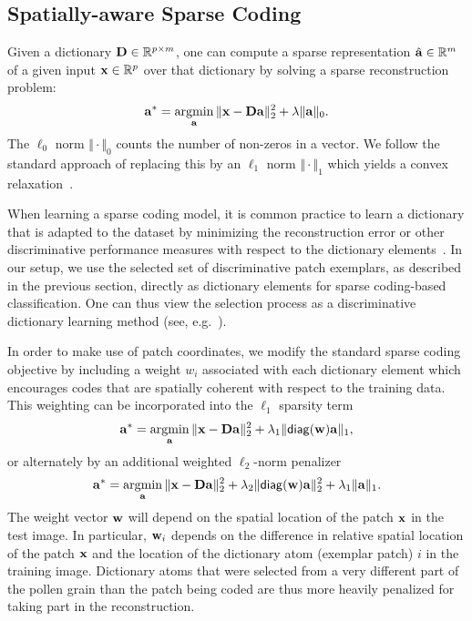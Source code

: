 \documentclass[10pt,twocolumn,letterpaper]{article}
\def\a{{\bf a}}
\def\D{{\bf D}}
\def\x{{\bf x}}
\def\w{{\bf w}}
\def\RB{{\mathbb R}}
\def\argmin{\mathop{\rm argmin}}
\def\diag{\mathsf{diag}}
\begin{document}
\subsection{Spatially-aware Sparse Coding}

Given a dictionary $\D\in \RB^{p\times m}$, one can compute a sparse
representation $\hat \a \in \RB^m$ of a given input $\x \in \RB^p$ over that
dictionary by solving a sparse reconstruction problem:
\begin{equation}
\a^* = \argmin_{\a}
\Vert \x - \D\a \Vert_2^2 + \lambda \Vert \a \Vert_0.
\label{eq:sparseCoding}
\end{equation}
The $\ell_0$ norm $\Vert \cdot\Vert_0$ counts the number of non-zeros in a vector.
We follow the standard approach of replacing this by an $\ell_1$ norm $\Vert
\cdot\Vert_1$ which yields a convex relaxation~\cite{aharon2006img}.

When learning a sparse coding model, it is common practice to learn a
dictionary that is adapted to the dataset by minimizing the reconstruction
error or other discriminative performance measures with respect to the
dictionary elements~\cite{aharon2006img,wright2010sparse}.
In our setup, we use the selected
set of discriminative patch exemplars, as described in the previous section, directly as dictionary elements for
sparse coding-based classification.  One can thus view the selection process as
a discriminative dictionary learning method (see,
e.g.~\cite{kong2012dictionary,ramirez2010classification,mairal2009supervised}).

In order to make use of patch coordinates, we modify the standard sparse coding
objective by including a weight $w_i$ associated with each dictionary element
which encourages codes that are spatially coherent with respect to the training
data.  This weighting can be incorporated into the $\ell_1$ sparsity term
\begin{equation}
\a^*= \argmin_{\a}\Vert \x - \D\a \Vert_2^2 + \lambda_1 \Vert \diag(\w) \a \Vert_1,
\label{eq:SC}
\end{equation}
or alternately by an additional weighted $\ell_2$-norm penalizer
\begin{equation}
\a^*= \argmin_{\a}\Vert \x - \D\a \Vert_2^2 + \lambda_2\Vert \diag(\w) \a\Vert_2^2 + \lambda_1 \Vert \a \Vert_1.
\label{eq:coSC}
\end{equation}
The weight vector $\w$ will depend on the spatial location of the patch $\x$ in
the test image. In particular, $\w_i$ depends on the difference in relative
spatial location of the patch $\x$ and the location of the dictionary atom
(exemplar patch) $i$ in the training image.  Dictionary atoms that were
selected from a very different part of the pollen grain than the patch being
coded are thus more heavily penalized for taking part in the reconstruction.
\end{document}
